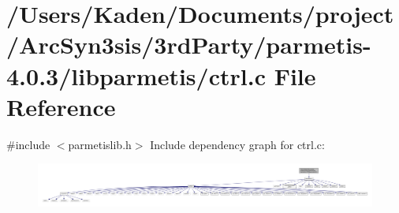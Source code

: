 \hypertarget{a00350}{}\section{/\+Users/\+Kaden/\+Documents/project/\+Arc\+Syn3sis/3rd\+Party/parmetis-\/4.0.3/libparmetis/ctrl.c File Reference}
\label{a00350}
{\ttfamily \#include $<$parmetislib.\+h$>$}\newline
Include dependency graph for ctrl.\+c\+:\nopagebreak
\begin{figure}[H]
\begin{center}
\leavevmode
\includegraphics[width=350pt]{a00351}
\end{center}
\end{figure}
